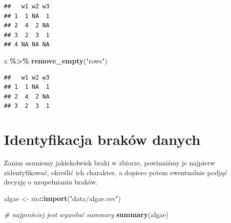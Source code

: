 \documentclass[
]{book}
\newenvironment{Shaded}{\begin{snugshade}}{\end{snugshade}}
\newcommand{\CommentTok}[1]{\textcolor[rgb]{0.56,0.35,0.01}{\textit{#1}}}
\newcommand{\FunctionTok}[1]{\textcolor[rgb]{0.13,0.29,0.53}{\textbf{#1}}}
\newcommand{\NormalTok}[1]{#1}
\newcommand{\OtherTok}[1]{\textcolor[rgb]{0.56,0.35,0.01}{#1}}
\newcommand{\SpecialCharTok}[1]{\textcolor[rgb]{0.81,0.36,0.00}{\textbf{#1}}}
\newcommand{\StringTok}[1]{\textcolor[rgb]{0.31,0.60,0.02}{#1}}
\theoremstyle{plain}
\theoremstyle{definition}
\theoremstyle{definition}
\theoremstyle{definition}
\theoremstyle{definition}
\theoremstyle{definition}
\theoremstyle{remark}
\begin{document}
\begin{verbatim}
##   w1 w2 w3
## 1  1 NA  1
## 2  4  2 NA
## 3  2  3  1
## 4 NA NA NA
\end{verbatim}

\begin{Shaded}
\begin{Highlighting}[]
\NormalTok{x }\SpecialCharTok{\%\textgreater{}\%} \FunctionTok{remove\_empty}\NormalTok{(}\StringTok{"rows"}\NormalTok{)}
\end{Highlighting}
\end{Shaded}

\begin{verbatim}
##   w1 w2 w3
## 1  1 NA  1
## 2  4  2 NA
## 3  2  3  1
\end{verbatim}

\section{Identyfikacja braków danych}\label{identyfikacja-brakuxf3w-danych}

Zanim usuniemy jakiekolwiek braki w zbiorze, powinniśmy je najpierw zidentyfikować, określić ich charakter, a dopiero potem ewentualnie podjąć decyzję o uzupełnianiu braków.

\begin{Shaded}
\begin{Highlighting}[]
\NormalTok{algae }\OtherTok{\textless{}{-}}\NormalTok{ rio}\SpecialCharTok{::}\FunctionTok{import}\NormalTok{(}\StringTok{"data/algae.csv"}\NormalTok{)}

\CommentTok{\# najprościej jest wywołać summary}
\FunctionTok{summary}\NormalTok{(algae)}
\end{Highlighting}
\end{Shaded}
\end{document}
